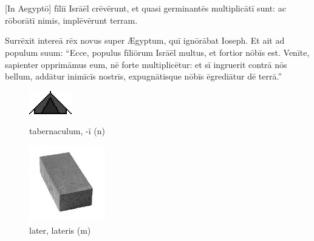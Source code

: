 \chapter{}




    [In Aegyptō] fīliī Isrāēl crēvērunt, et quasi germinantēs multiplicātī sunt:
ac rōborātī nimis, implēvērunt terram.

Surrēxit intereā rēx novus super Ægyptum, quī ignōrābat Ioseph.
Et ait ad populum suum: ``Ecce, populus fīliōrum Isrāēl multus, et fortior nōbīs est.
Venīte, sapien\-ter opprimāmus eum, nē forte multiplicētur: et sī ingruerit contrā nōs bellum, addātur inimīcīs nostrīs, expugnātisque nōbīs ēgrediātur dē terrā.''

\begin{figure}[h]
    \begin{minipage}[h]{0.5\linewidth}
        \centering
        \includegraphics{tab}
        \caption{tabernaculum, -ī (n)}
    \end{minipage}%
    \begin{minipage}[h]{0.5\linewidth}
        \vspace*{-0.3cm}
        \centering
        \includegraphics{later}
        \vspace*{-0.425cm}
        \caption{later, lateris (m)}
    \end{minipage}
\end{figure}

